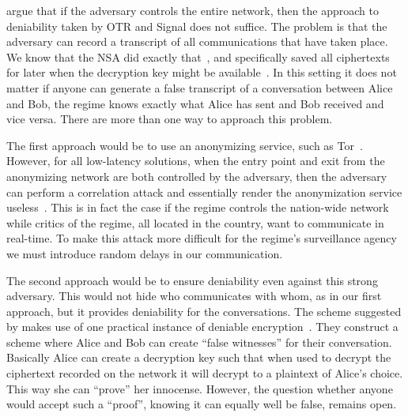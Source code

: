 \citet{OTPKX} argue that if the adversary controls the entire network, then the
approach to deniability taken by \ac{OTR} and Signal does not suffice.
The problem is that the adversary can record a transcript of all communications
that have taken place.
We know that the \ac{NSA} did exactly that~\cite{XKeyscore}, and specifically 
saved all ciphertexts for later when the decryption key might be 
available~\cite{NSAsavesCiphertexts}.
In this setting it does not matter if anyone can generate a false transcript of
a conversation between Alice and Bob, the regime knows exactly what Alice has 
sent and Bob received and vice versa.
There are more than one way to approach this problem.

The first approach would be to use an anonymizing service, such as 
Tor~\cite{Tor}.
However, for all low-latency solutions, when the entry point and exit from the 
anonymizing network are both controlled by the adversary, then the adversary 
can perform a correlation attack and essentially render the anonymization 
service useless~\cite{SystemsForAnonymousCommunication}.
This is in fact the case if the regime controls the nation-wide network while 
critics of the regime, all located in the country, want to communicate in 
real-time.
To make this attack more difficult for the regime's surveillance agency we must 
introduce random delays in our communication.

The second approach would be to ensure deniability even against this strong 
adversary.
This would not hide who communicates with whom, as in our first approach, but 
it provides deniability for the conversations.
The scheme suggested by \citet{OTPKX} makes use of one practical instance of 
deniable encryption~\cite{DeniableEncryption}.
They construct a scheme where Alice and Bob can create \enquote{false 
witnesses} for their conversation.
Basically Alice can create a decryption key such that when used to decrypt the 
ciphertext recorded on the network it will decrypt to a plaintext of Alice's 
choice.
This way she can \enquote{prove} her innocense.
However, the question whether anyone would accept such a \enquote{proof}, 
knowing it can equally well be false, remains open.
